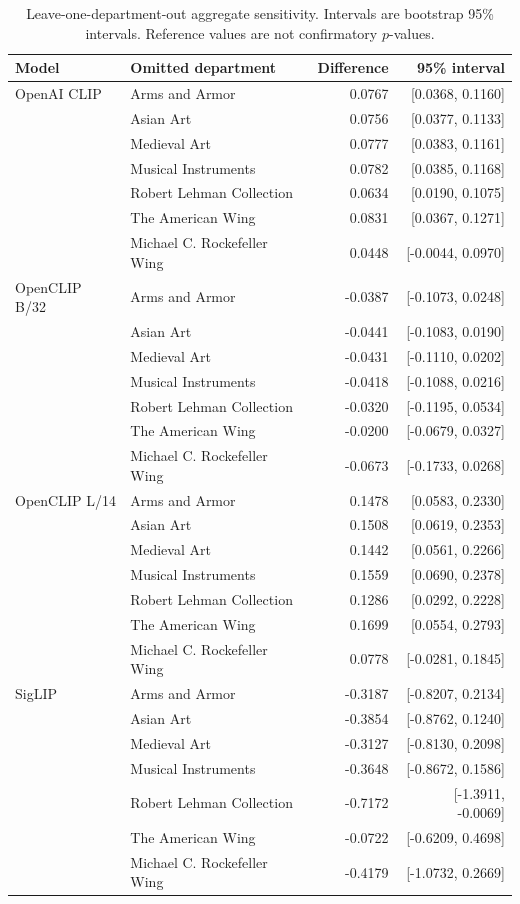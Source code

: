 \documentclass[pdflatex,sn-basic,Numbered]{sn-jnl}
\begin{document}
\begin{table}[htbp]
\centering
\caption{Leave-one-department-out aggregate sensitivity. Intervals are bootstrap 95\% intervals. Reference values are not confirmatory $p$-values.}
\label{tab:department}
\scriptsize
\begin{tabular}{llrr}
\toprule
Model & Omitted department & Difference & 95\% interval \\
\midrule
OpenAI CLIP & Arms and Armor & 0.0767 & [0.0368, 0.1160] \\
 & Asian Art & 0.0756 & [0.0377, 0.1133] \\
 & Medieval Art & 0.0777 & [0.0383, 0.1161] \\
 & Musical Instruments & 0.0782 & [0.0385, 0.1168] \\
 & Robert Lehman Collection & 0.0634 & [0.0190, 0.1075] \\
 & The American Wing & 0.0831 & [0.0367, 0.1271] \\
 & Michael C. Rockefeller Wing & 0.0448 & [-0.0044, 0.0970] \\
\midrule
OpenCLIP B/32 & Arms and Armor & -0.0387 & [-0.1073, 0.0248] \\
 & Asian Art & -0.0441 & [-0.1083, 0.0190] \\
 & Medieval Art & -0.0431 & [-0.1110, 0.0202] \\
 & Musical Instruments & -0.0418 & [-0.1088, 0.0216] \\
 & Robert Lehman Collection & -0.0320 & [-0.1195, 0.0534] \\
 & The American Wing & -0.0200 & [-0.0679, 0.0327] \\
 & Michael C. Rockefeller Wing & -0.0673 & [-0.1733, 0.0268] \\
\midrule
OpenCLIP L/14 & Arms and Armor & 0.1478 & [0.0583, 0.2330] \\
 & Asian Art & 0.1508 & [0.0619, 0.2353] \\
 & Medieval Art & 0.1442 & [0.0561, 0.2266] \\
 & Musical Instruments & 0.1559 & [0.0690, 0.2378] \\
 & Robert Lehman Collection & 0.1286 & [0.0292, 0.2228] \\
 & The American Wing & 0.1699 & [0.0554, 0.2793] \\
 & Michael C. Rockefeller Wing & 0.0778 & [-0.0281, 0.1845] \\
\midrule
SigLIP & Arms and Armor & -0.3187 & [-0.8207, 0.2134] \\
 & Asian Art & -0.3854 & [-0.8762, 0.1240] \\
 & Medieval Art & -0.3127 & [-0.8130, 0.2098] \\
 & Musical Instruments & -0.3648 & [-0.8672, 0.1586] \\
 & Robert Lehman Collection & -0.7172 & [-1.3911, -0.0069] \\
 & The American Wing & -0.0722 & [-0.6209, 0.4698] \\
 & Michael C. Rockefeller Wing & -0.4179 & [-1.0732, 0.2669] \\
\bottomrule
\end{tabular}
\end{table}
\end{document}

